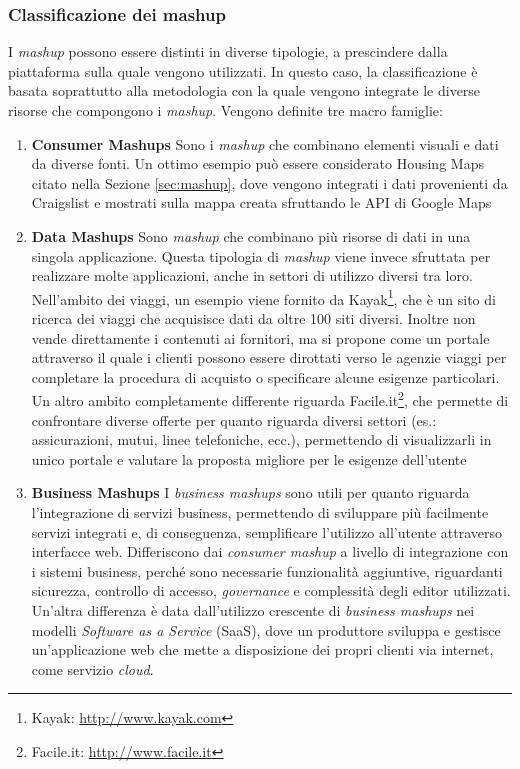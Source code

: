\subsubsection{Classificazione dei mashup\label{sec:mashup-classification}}

I \emph{mashup} possono essere distinti in diverse tipologie, a prescindere dalla piattaforma sulla quale vengono utilizzati.
In questo caso, la classificazione è basata soprattutto alla metodologia con la quale vengono integrate le diverse risorse che compongono i \emph{mashup}. Vengono definite tre macro famiglie:

\begin{enumerate}
	\item \textbf{Consumer Mashups}
	Sono i \emph{mashup} che combinano elementi visuali e dati da diverse fonti. Un ottimo esempio può essere considerato Housing Maps citato nella Sezione \ref{sec:mashup}, dove vengono integrati i dati provenienti da Craigslist e mostrati sulla mappa creata sfruttando le API di Google Maps
	\item \textbf{Data Mashups}
	Sono \emph{mashup} che combinano più risorse di dati in una singola applicazione. Questa tipologia di \emph{mashup} viene invece sfruttata per realizzare molte applicazioni, anche in settori di utilizzo diversi tra loro.
	Nell'ambito dei viaggi, un esempio viene fornito da Kayak\footnote{Kayak: \url{http://www.kayak.com}}, che è un sito di ricerca dei viaggi che acquisisce dati da oltre 100 siti diversi. Inoltre non vende direttamente i contenuti ai fornitori, ma si propone come un portale attraverso il quale i clienti possono essere dirottati verso le agenzie viaggi per completare la procedura di acquisto o specificare alcune esigenze particolari.
	Un altro ambito completamente differente riguarda Facile.it\footnote{Facile.it: \url{http://www.facile.it}}, che permette di confrontare diverse offerte per quanto riguarda diversi settori (es.: assicurazioni, mutui, linee telefoniche, ecc.), permettendo di visualizzarli in unico portale e valutare la proposta migliore per le esigenze dell'utente
	\item \textbf{Business Mashups}
	I \emph{business mashups} sono utili per quanto riguarda l'in\-te\-gra\-zio\-ne di servizi business, permettendo di sviluppare più facilmente servizi integrati e, di conseguenza, semplificare l'utilizzo all'utente attraverso interfacce web. Differiscono dai \emph{consumer mashup} a livello di integrazione con i sistemi business, perché sono necessarie funzionalità aggiuntive, riguardanti sicurezza, controllo di accesso, \emph{governance} e complessità degli editor utilizzati. Un'altra differenza è data dall'utilizzo crescente di \emph{business mashups} nei modelli \emph{Software as a Service} (SaaS), dove un produttore sviluppa e gestisce un'applicazione web che mette a disposizione dei propri clienti via internet, come servizio \emph{cloud}.
\end{enumerate}

